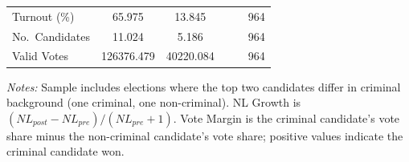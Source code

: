\begin{table}[htbp]
\begin{tabular}{l ccccc}
Turnout (\%)                   & 65.975 & 13.845 & & & 964 \\
No.\ Candidates                & 11.024 & 5.186 & & & 964 \\
Valid Votes                    & 126376.479 & 40220.084 & & & 964 \\
\bottomrule
\end{tabular}
\begin{minipage}{0.92\textwidth}
\vspace{4pt}
\footnotesize
\textit{Notes:} Sample includes elections where the top two candidates differ in criminal
background (one criminal, one non-criminal). NL Growth is $(NL_{post} - NL_{pre})/(NL_{pre}+1)$.
Vote Margin is the criminal candidate's vote share minus the non-criminal candidate's vote share;
positive values indicate the criminal candidate won.
\end{minipage}
\end{table}

